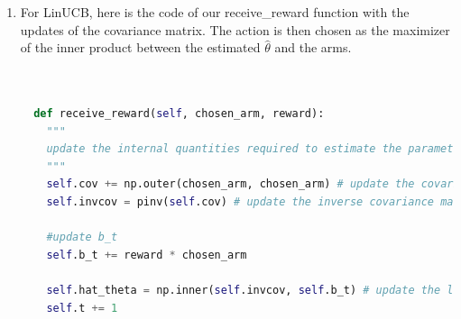\begin{enumerate}
    \item For LinUCB, here is the code of our receive\_reward function with the updates of the covariance matrix. The action is then chosen as the maximizer of the inner product between the estimated $\hat{\theta}$ and the arms.

    \begin{lstlisting}[language=Python]

        
  def receive_reward(self, chosen_arm, reward):
    """
    update the internal quantities required to estimate the parameter theta using least squares
    """
    self.cov += np.outer(chosen_arm, chosen_arm) # update the covariance matrix
    self.invcov = pinv(self.cov) # update the inverse covariance matrix

    #update b_t
    self.b_t += reward * chosen_arm

    self.hat_theta = np.inner(self.invcov, self.b_t) # update the least square estimate
    self.t += 1
    \end{lstlisting}



\end{enumerate}
